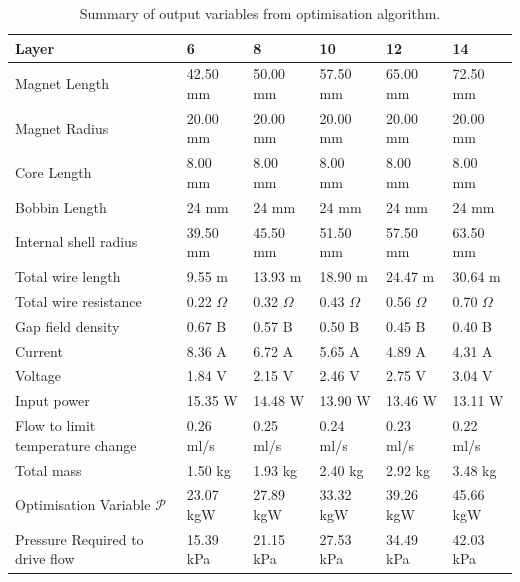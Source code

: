\documentclass[a4paper,12pt]{article}
\begin{document}
\begin{table}[h!]
    \centering
    \caption{Summary of output variables from optimisation algorithm.}
    \label{tb:optout}
    \begin{tabular}{M | V | V | V | V | V}
        \hline
        Layer                            & 6  & 8  & 10 & 12 & 14 \\
        \hline\hline
        Magnet Length                    & 42.50 mm & 50.00 mm & 57.50 mm & 65.00 mm & 72.50 mm\\
        \hline
        Magnet Radius                    & 20.00 mm& 20.00 mm& 20.00 mm& 20.00 mm& 20.00 mm\\
        \hline
        Core Length                      & 8.00 mm& 8.00 mm& 8.00 mm& 8.00 mm& 8.00 mm\\
        \hline
        Bobbin Length                    & 24 mm& 24 mm& 24 mm& 24 mm& 24 mm\\
        \hline
        Internal shell radius            & 39.50 mm& 45.50 mm& 51.50 mm& 57.50 mm& 63.50 mm\\
        \hline
        Total wire length                & 9.55 m & 13.93 m& 18.90 m& 24.47 m& 30.64 m\\
        \hline
        Total wire resistance            & 0.22 $\Omega$& 0.32 $\Omega$& 0.43 $\Omega$& 0.56 $\Omega$& 0.70 $\Omega$\\
        \hline
        Gap field density                & 0.67 B& 0.57 B& 0.50 B& 0.45 B& 0.40 B\\
        \hline
        Current                          & 8.36 A& 6.72 A& 5.65 A& 4.89 A& 4.31 A\\
        \hline
        Voltage                          & 1.84 V& 2.15 V& 2.46 V& 2.75 V& 3.04 V\\
        \hline
        Input power                      & 15.35 W& 14.48 W& 13.90 W& 13.46 W& 13.11 W\\
        \hline
        Flow to limit temperature change & 0.26 ml/s& 0.25 ml/s& 0.24 ml/s& 0.23 ml/s& 0.22 ml/s\\
        \hline
        Total mass                       & 1.50 kg& 1.93 kg& 2.40 kg& 2.92 kg& 3.48 kg\\
        \hline
        Optimisation Variable $\mathcal{P}$         & 23.07 kgW& 27.89 kgW& 33.32 kgW& 39.26 kgW& 45.66 kgW\\
        \hline
        Pressure Required to drive flow  & 15.39 kPa& 21.15 kPa& 27.53 kPa& 34.49 kPa& 42.03 kPa\\
        \hline
    \end{tabular}
\end{table}
\end{document}
